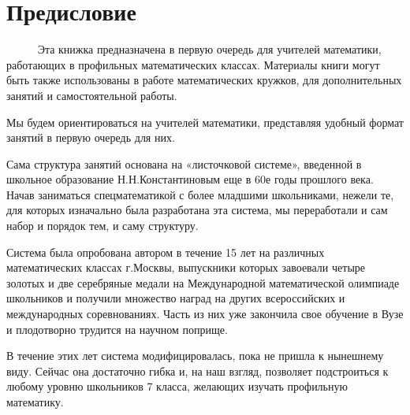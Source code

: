 
		\section{Предисловие}

	~~~~~ Эта книжка предназначена в первую очередь для учителей математики, работающих в профильных математических классах. Материалы книги могут быть также использованы в работе математических кружков, для дополнительных занятий и самостоятельной работы.
	
	Мы будем ориентироваться на учителей математики, представляя удобный формат занятий в первую очередь для них.
	
	Сама структура занятий основана на «листочковой системе», введенной в школьное образование Н.Н.Константиновым еще в 60е годы прошлого века. Начав заниматься спецматематикой с более младшими школьниками, нежели те, для которых изначально была разработана эта система, мы переработали и сам набор и порядок тем, и саму структуру.
	 
	Система была опробована автором в течение 15 лет на различных математических классах г.Москвы, выпускники которых завоевали четыре золотых и две серебряные медали на Международной математической олимпиаде школьников и получили множество наград на других всероссийских и международных соревнованиях. Часть из них уже закончила свое обучение в Вузе и плодотворно трудится на научном поприще.
	
	В течение этих лет система модифицировалась, пока не пришла к нынешнему виду. Сейчас она достаточно гибка и, на наш взгляд, позволяет подстроиться к любому уровню школьников 7 класса, желающих изучать профильную математику.
	
